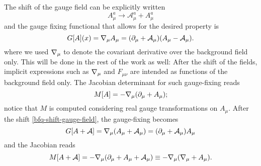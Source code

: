 The shift of the gauge field can be explicitly written
\begin{equation}\label{bfq-shift-gauge-field}
A_\mu^a \to  \mathcal{A}_\mu^a + A_\mu^a 
\end{equation}
and the gauge fixing functional that allows for the desired property is
\begin{equation}\label{bfq-gauge-fixing}
G[A](x) = { \mathcal{\nabla} }_\mu A_\mu 
	= (\partial_\mu + \mathcal{A}_\mu) ( A_\mu - \mathcal{A}_\mu ).
\end{equation}
where we used ${ \mathcal{\nabla} }_\mu$ to denote the covariant derivative over the background field only. This will be done in the rest of the work as well: After the shift of the fields, implicit expressions such as ${ \mathcal{\nabla} }_\mu$ and $F_{\mu\nu}$ are intended as functions of the background field only.
The Jacobian determinant for such gauge-fixing reads
\begin{equation}
M[A] = - { \mathcal{\nabla} }_\mu (\partial_\mu + A_\mu);
\end{equation}
notice that $M$ is computed considering real gauge transformations on $A_\mu$.
After the shift \eqref{bfq-shift-gauge-field}, the gauge-fixing becomes
\begin{equation}
G[A+ \mathcal{A}] = { \mathcal{\nabla} }_\mu( A_\mu + \mathcal{A}_\mu)
 = (\partial_\mu + \mathcal{A}_\mu) A_\mu 
\end{equation}
and the Jacobian reads
\begin{equation}
M[A+\mathcal{A}] = - { \mathcal{\nabla} }_\mu (\partial_\mu + A_\mu + \mathcal{A}_\mu)
	\equiv - { \mathcal{\nabla} }_\mu ({ \mathcal{\nabla} }_\mu + A_\mu).
\end{equation}


